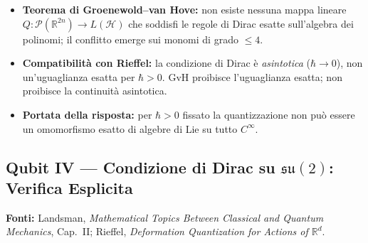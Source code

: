 \documentclass[12pt, a4paper]{article}
\newcommand{\fonti}[1]{%
	\begin{fontebox}
		\textcolor{fontecolor}{\footnotesize\textbf{Fonti:} #1}
	\end{fontebox}%
}
\begin{document}
	\begin{itemize}
		\item \textbf{Teorema di Groenewold--van Hove:} non esiste nessuna mappa lineare
		$Q:\mathcal{P}(\mathbb{R}^{2n})\to L(\mathcal{H})$ che soddisfi le regole di
		Dirac esatte sull'algebra dei polinomi; il conflitto emerge sui monomi di grado
		$\leq 4$.
		\item \textbf{Compatibilità con Rieffel:} la condizione di Dirac è \emph{asintotica}
		($\hbar\to 0$), non un'uguaglianza esatta per $\hbar>0$. GvH proibisce l'uguaglianza
		esatta; non proibisce la continuità asintotica.
		\item \textbf{Portata della risposta:} per $\hbar>0$ fissato la quantizzazione
		non può essere un omomorfismo esatto di algebre di Lie su tutto $C^\infty$.
	\end{itemize}
	
	\subsection{Qubit IV --- Condizione di Dirac su $\mathfrak{su}(2)$: Verifica Esplicita}
	
	\fonti{Landsman, \textit{Mathematical Topics Between Classical and Quantum Mechanics},
		Cap.~II; Rieffel, \textit{Deformation Quantization for Actions of $\mathbb{R}^d$}.}
	
\end{document}
